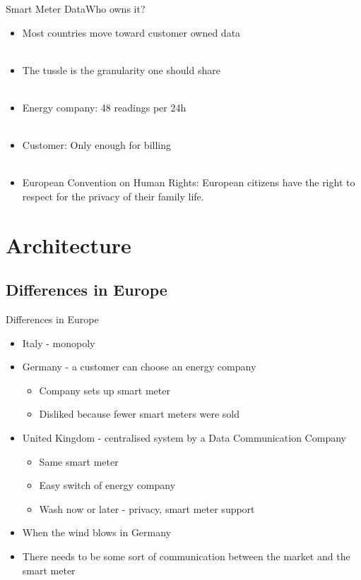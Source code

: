 \documentclass[10pt]{beamer}
\begin{document}
\begin{frame}{Smart Meter Data}{Who owns it?}
	\begin{itemize}
		\item Most countries move toward customer owned data
		\\~\\
		\item The tussle is the granularity one should share
		\\~\\
		\item Energy company: 48 readings per 24h
		\\~\\
		\item Customer: Only enough for billing
		\\~\\
		\item European Convention on Human Rights: European citizens have the right to respect for the privacy	of their family life.
	\end{itemize}
\end{frame}

\section{Architecture}
\subsection{Differences in Europe}
\begin{frame}{Differences in Europe}
	\begin{itemize}
	\item Italy - monopoly
		\item Germany - a customer can choose an energy company
		\begin{itemize}
			\item Company sets up smart meter
			\item Disliked because fewer smart meters were sold
		\end{itemize}
		\item United Kingdom - centralised system by a Data Communication Company
			\begin{itemize}
				\item Same smart meter
				\item Easy switch of energy company
				\item Wash now or later - privacy, smart meter support
			\end{itemize}
			
			                      	\item When the wind blows in Germany
			                      	\item There needs to be some sort of communication between the market and the smart meter
	\end{itemize}
\end{frame}
\end{document}
